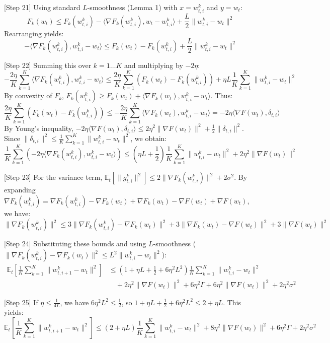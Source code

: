 \documentclass{article}
\begin{document}
[Step 21] Using standard $L$-smoothness (Lemma 1) with $x = w_{t,i}^k$ and $y = w_t$:
$$ F_k(w_t) \leq F_k(w_{t,i}^k) - \langle \nabla F_k(w_{t,i}^k), w_t - w_{t,i}^k \rangle + \frac{L}{2}\|w_{t,i}^k - w_t\|^2 $$
Rearranging yields:
$$ - \langle \nabla F_k(w_{t,i}^k), w_{t,i}^k - w_t \rangle \leq F_k(w_t) - F_k(w_{t,i}^k) + \frac{L}{2}\|w_{t,i}^k - w_t\|^2 $$

[Step 22] Summing this over $k=1 \dots K$ and multiplying by $-2\eta$:
$$ -\frac{2\eta}{K}\sum_{k=1}^K \langle \nabla F_k(w_{t,i}^k), w_{t,i}^k - w_t \rangle \leq \frac{2\eta}{K}\sum_{k=1}^K \left( F_k(w_t) - F_k(w_{t,i}^k) \right) + \eta L \frac{1}{K}\sum_{k=1}^K \|w_{t,i}^k - w_t\|^2 $$
By convexity of $F_k$, $F_k(w_{t,i}^k) \geq F_k(w_t) + \langle \nabla F_k(w_t), w_{t,i}^k - w_t \rangle$. Thus:
$$ \frac{2\eta}{K}\sum_{k=1}^K \left( F_k(w_t) - F_k(w_{t,i}^k) \right) \leq -\frac{2\eta}{K}\sum_{k=1}^K \langle \nabla F_k(w_t), w_{t,i}^k - w_t \rangle = -2\eta \langle \nabla F(w_t), \delta_{t,i} \rangle $$
By Young's inequality, $-2\eta \langle \nabla F(w_t), \delta_{t,i} \rangle \leq 2\eta^2 \|\nabla F(w_t)\|^2 + \frac{1}{2} \|\delta_{t,i}\|^2$. Since $\|\delta_{t,i}\|^2 \leq \frac{1}{K}\sum_{k=1}^K \|w_{t,i}^k - w_t\|^2$, we obtain:
$$ \frac{1}{K}\sum_{k=1}^K \left( -2\eta \langle \nabla F_k(w_{t,i}^k), w_{t,i}^k - w_t \rangle \right) \leq (\eta L + \frac{1}{2}) \frac{1}{K}\sum_{k=1}^K \|w_{t,i}^k - w_t\|^2 + 2\eta^2 \|\nabla F(w_t)\|^2 $$

[Step 23] For the variance term, $\mathbb{E}_t[\|g_{t,i}^k\|^2] \leq 2\|\nabla F_k(w_{t,i}^k)\|^2 + 2\sigma^2$. By expanding $\nabla F_k(w_{t,i}^k) = \nabla F_k(w_{t,i}^k) - \nabla F_k(w_t) + \nabla F_k(w_t) - \nabla F(w_t) + \nabla F(w_t)$, we have:
$$ \|\nabla F_k(w_{t,i}^k)\|^2 \leq 3\|\nabla F_k(w_{t,i}^k) - \nabla F_k(w_t)\|^2 + 3\|\nabla F_k(w_t) - \nabla F(w_t)\|^2 + 3\|\nabla F(w_t)\|^2 $$

[Step 24] Substituting these bounds and using $L$-smoothness ($\|\nabla F_k(w_{t,i}^k) - \nabla F_k(w_t)\|^2 \leq L^2\|w_{t,i}^k - w_t\|^2$):
\begin{align*}
\mathbb{E}_t\left[ \frac{1}{K}\sum_{k=1}^K \|w_{t,i+1}^k - w_t\|^2 \right] &\leq (1 + \eta L + \frac{1}{2} + 6\eta^2 L^2) \frac{1}{K}\sum_{k=1}^K \|w_{t,i}^k - w_t\|^2 \\
&\quad + 2\eta^2 \|\nabla F(w_t)\|^2 + 6\eta^2 \Gamma + 6\eta^2 \|\nabla F(w_t)\|^2 + 2\eta^2 \sigma^2
\end{align*}

[Step 25] If $\eta \leq \frac{1}{4L}$, we have $6\eta^2 L^2 \leq \frac{1}{2}$, so $1 + \eta L + \frac{1}{2} + 6\eta^2 L^2 \leq 2 + \eta L$. This yields:
$$ \mathbb{E}_t\left[ \frac{1}{K}\sum_{k=1}^K \|w_{t,i+1}^k - w_t\|^2 \right] \leq (2 + \eta L) \frac{1}{K}\sum_{k=1}^K \|w_{t,i}^k - w_t\|^2 + 8\eta^2 \|\nabla F(w_t)\|^2 + 6\eta^2 \Gamma + 2\eta^2 \sigma^2 $$
\end{document}
